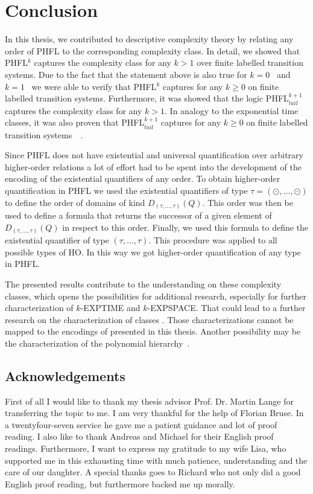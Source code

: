 \chapter{Conclusion}

In this thesis, we contributed to descriptive complexity theory by relating any order of PHFL to the corresponding complexity class. In detail, we showed that PHFL$^k$ captures the complexity class  for any $k > 1$ over finite labelled transition systems. Due to the fact that the statement above is also true for $k = 0$~\cite{otto1999bisimulation} and $k = 1$~\cite{lange2014capturing} we were able to verify that PHFL$^k$ captures  for any $k \geq 0$ on finite labelled transition systems. Furthermore, it was showed that the logic PHFL$^{k+1}_{tail}$ captures the complexity class  for any $k > 1$. In analogy to the exponential time classes, it was also proven that PHFL$^{k+1}_{tail}$ captures  for any $k \geq 0$ on finite labelled transition systems~\cite{otto1999bisimulation}~\cite{lange2014capturing}.

Since PHFL does not have existential and universal quantification over arbitrary higher-order relations a lot of effort had to be spent into the development of the encoding of the existential quantifiers of any order.
To obtain higher-order quantification in PHFL we used the existential quantifiers of type $\tau = (\odot, \dots, \odot)$ to define the order of domains of kind
$D_{(\tau, \dots, \tau)}(Q)$. This order was then be used to define a formula that returns the successor
of a given element of $D_{(\tau, \dots, \tau)}(Q)$ in respect to this order. Finally, we used this
formula to define the existential quantifier of type $(\tau, \dots, \tau)$. This procedure was applied to all
possible types of HO. In this way we got higher-order quantification of any type in PHFL.

The presented results contribute to the understanding on these complexity classes, which opens the possibilities for additional research, especially for further characterization of $k$-EXPTIME and $k$-EXPSPACE. That could lead to a further research on the characterization of classes . Those characterizations cannot be mapped to the encodings of  presented in this thesis. Another possibility may be the characterization of the polynomial hierarchy~\cite{stockmeyer1976polynomial}.

\section*{Acknowledgements}

First of all I would like to thank my thesis advisor Prof. Dr. Martin Lange for transferring the topic to me. I am very thankful for the help of Florian Bruse. In a twentyfour-seven service he gave me a patient guidance and lot of proof reading. I also like to thank Andreas and Michael for their English proof readings. Furthermore, I want to express my gratitude to my wife Lisa, who supported me in this exhausting time with much patience, understanding and the care of our daughter. A special thanks goes to Richard who not only did a good English proof reading, but furthermore backed me up morally. 